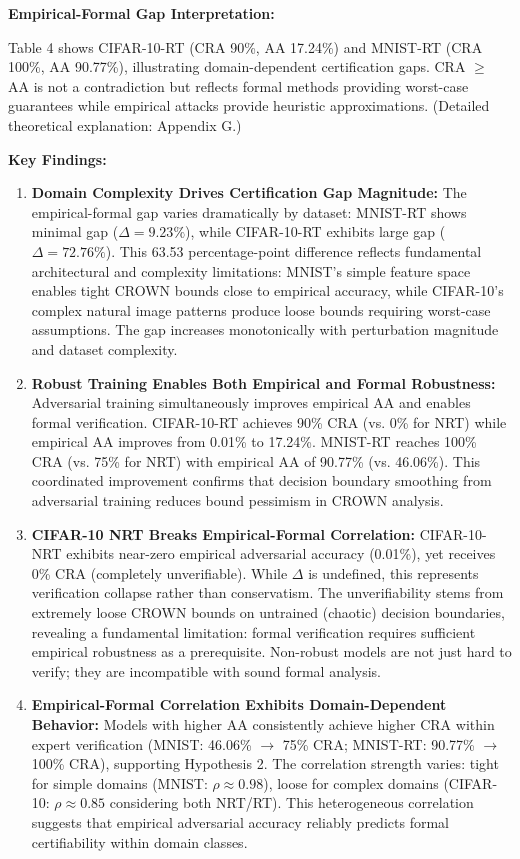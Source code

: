 \documentclass[11pt,a4paper]{article}
\begin{document}
\textbf{Empirical-Formal Gap Interpretation:}

Table 4 shows CIFAR-10-RT (CRA 90\%, AA 17.24\%) and MNIST-RT (CRA 100\%, AA 90.77\%), illustrating domain-dependent certification gaps. CRA $\geq$ AA is not a contradiction but reflects formal methods providing worst-case guarantees while empirical attacks provide heuristic approximations. (Detailed theoretical explanation: Appendix G.)

\textbf{Key Findings:}

\begin{enumerate}
    \item \textbf{Domain Complexity Drives Certification Gap Magnitude:} The empirical-formal gap varies dramatically by dataset: MNIST-RT shows minimal gap ($\Delta = 9.23\%$), while CIFAR-10-RT exhibits large gap ($\Delta = 72.76\%$). This 63.53 percentage-point difference reflects fundamental architectural and complexity limitations: MNIST's simple feature space enables tight CROWN bounds close to empirical accuracy, while CIFAR-10's complex natural image patterns produce loose bounds requiring worst-case assumptions. The gap increases monotonically with perturbation magnitude and dataset complexity.

    \item \textbf{Robust Training Enables Both Empirical and Formal Robustness:} Adversarial training simultaneously improves empirical AA and enables formal verification. CIFAR-10-RT achieves 90\% CRA (vs. 0\% for NRT) while empirical AA improves from 0.01\% to 17.24\%. MNIST-RT reaches 100\% CRA (vs. 75\% for NRT) with empirical AA of 90.77\% (vs. 46.06\%). This coordinated improvement confirms that decision boundary smoothing from adversarial training reduces bound pessimism in CROWN analysis.

    \item \textbf{CIFAR-10 NRT Breaks Empirical-Formal Correlation:} CIFAR-10-NRT exhibits near-zero empirical adversarial accuracy (0.01\%), yet receives 0\% CRA (completely unverifiable). While $\Delta$ is undefined, this represents verification collapse rather than conservatism. The unverifiability stems from extremely loose CROWN bounds on untrained (chaotic) decision boundaries, revealing a fundamental limitation: formal verification requires sufficient empirical robustness as a prerequisite. Non-robust models are not just hard to verify; they are incompatible with sound formal analysis.

    \item \textbf{Empirical-Formal Correlation Exhibits Domain-Dependent Behavior:} Models with higher AA consistently achieve higher CRA within expert verification (MNIST: 46.06\% $\to$ 75\% CRA; MNIST-RT: 90.77\% $\to$ 100\% CRA), supporting Hypothesis 2. The correlation strength varies: tight for simple domains (MNIST: $\rho \approx 0.98$), loose for complex domains (CIFAR-10: $\rho \approx 0.85$ considering both NRT/RT). This heterogeneous correlation suggests that empirical adversarial accuracy reliably predicts formal certifiability within domain classes.


\end{enumerate}
\end{document}
